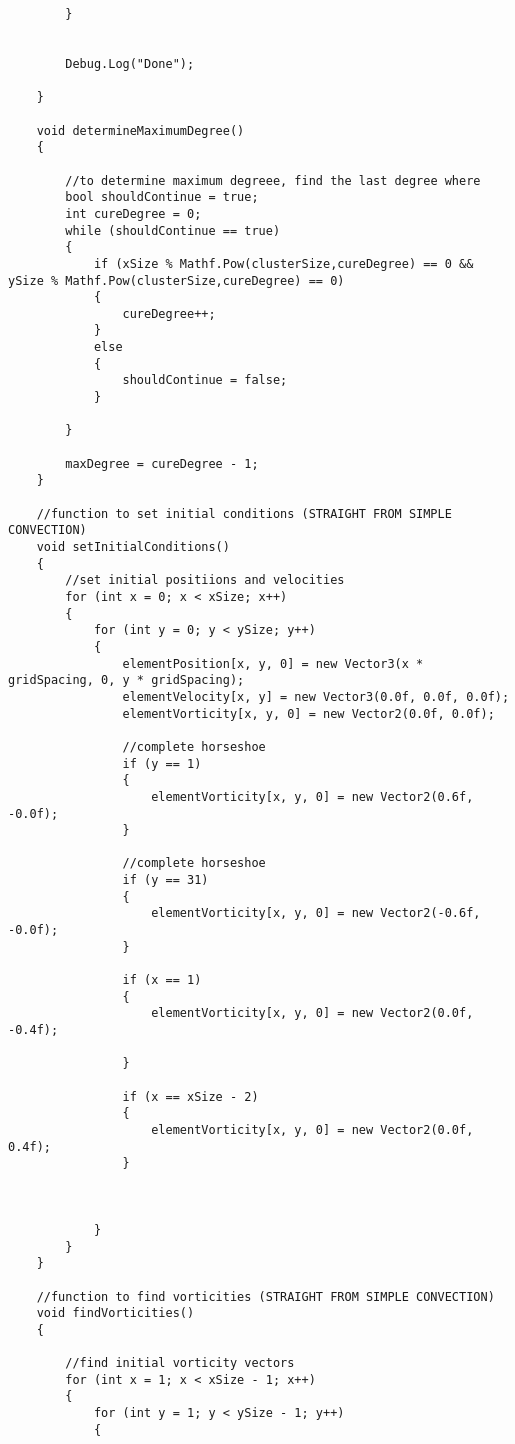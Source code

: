 \begin{mdframed}[linecolor=black, topline=true, bottomline=true,
  leftline=false, rightline=false]
\begin{verbatim}
        }


        Debug.Log("Done");

    }

    void determineMaximumDegree()
    {

        //to determine maximum degreee, find the last degree where 
        bool shouldContinue = true;
        int cureDegree = 0;
        while (shouldContinue == true)
        {
            if (xSize % Mathf.Pow(clusterSize,cureDegree) == 0 && ySize % Mathf.Pow(clusterSize,cureDegree) == 0)
            {
                cureDegree++;
            }
            else
            {
                shouldContinue = false;
            }
            
        }

        maxDegree = cureDegree - 1;
    }

    //function to set initial conditions (STRAIGHT FROM SIMPLE CONVECTION)
    void setInitialConditions()
    {
        //set initial positiions and velocities
        for (int x = 0; x < xSize; x++)
        {
            for (int y = 0; y < ySize; y++)
            {
                elementPosition[x, y, 0] = new Vector3(x * gridSpacing, 0, y * gridSpacing);
                elementVelocity[x, y] = new Vector3(0.0f, 0.0f, 0.0f);
                elementVorticity[x, y, 0] = new Vector2(0.0f, 0.0f);

                //complete horseshoe
                if (y == 1)
                {
                    elementVorticity[x, y, 0] = new Vector2(0.6f, -0.0f);
                }

                //complete horseshoe
                if (y == 31)
                {
                    elementVorticity[x, y, 0] = new Vector2(-0.6f, -0.0f);
                }

                if (x == 1)
                {
                    elementVorticity[x, y, 0] = new Vector2(0.0f, -0.4f);

                }

                if (x == xSize - 2)
                {
                    elementVorticity[x, y, 0] = new Vector2(0.0f, 0.4f);
                }

                

            }
        }
    }

    //function to find vorticities (STRAIGHT FROM SIMPLE CONVECTION)
    void findVorticities()
    {

        //find initial vorticity vectors
        for (int x = 1; x < xSize - 1; x++)
        {
            for (int y = 1; y < ySize - 1; y++)
            {


\end{verbatim}
\end{mdframed}
